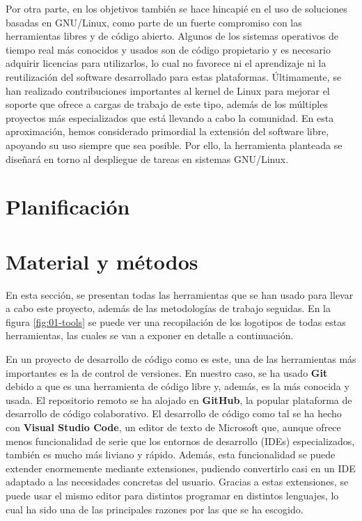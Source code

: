 Por otra parte, en los objetivos también se hace hincapié en el uso de
soluciones basadas en GNU/Linux, como parte de un fuerte compromiso con las
herramientas libres y de código abierto. Algunos de los sistemas operativos de
tiempo real más conocidos y usados son de código propietario y es necesario
adquirir licencias para utilizarlos, lo cual no favorece ni el aprendizaje ni la
reutilización del software desarrollado para estas plataformas. Últimamente, se
han realizado contribuciones importantes al kernel de Linux para mejorar el
soporte que ofrece a cargas de trabajo de este tipo, además de los múltiples
proyectos más especializados que está llevando a cabo la comunidad. En esta
aproximación, hemos considerado primordial la extensión del software libre,
apoyando su uso siempre que sea posible. Por ello, la herramienta planteada se
diseñará en torno al despliegue de tareas en sistemas GNU/Linux.

\section{Planificación}

\section{Material y métodos}

En esta sección, se presentan todas las herramientas que se han usado para
llevar a cabo este proyecto, además de las metodologías de trabajo seguidas. En
la figura \ref{fig:01-tools} se puede ver una recopilación de los logotipos de
todas estas herramientas, las cuales se van a exponer en detalle a continuación.

En un proyecto de desarrollo de código como es este, una de las herramientas más
importantes es la de control de versiones. En nuestro caso, se ha usado
\textbf{Git} debido a que es una herramienta de código libre y, además, es la
más conocida y usada. El repositorio remoto se ha alojado en \textbf{GitHub}, la
popular plataforma de desarrollo de código colaborativo. El desarrollo de código
como tal se ha hecho con \textbf{Visual Studio Code}, un editor de texto de
Microsoft que, aunque ofrece menos funcionalidad de serie que los entornos de
desarrollo (IDEs) especializados, también es mucho más liviano y rápido. Además,
esta funcionalidad se puede extender enormemente mediante extensiones, pudiendo
convertirlo casi en un IDE adaptado a las necesidades concretas del usuario.
Gracias a estas extensiones, se puede usar el mismo editor para distintos
programar en distintos lenguajes, lo cual ha sido una de las principales razones
por las que se ha escogido.

